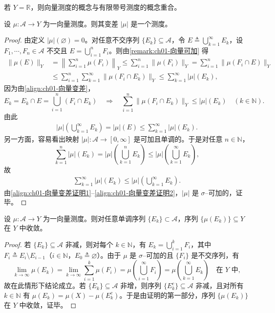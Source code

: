 \documentclass[../../main.tex]{subfiles}%
\begin{document}
\begin{remark}\label{remark:ch01-向量测度Y=R}
若 $Y=\mathbb{R}$，则向量测度的概念与有限带号测度的概念重合。
\end{remark}

\begin{proposition}\label{proposition:ch01-向量变差是测度}
设 $\mu:\mathcal{A}\to Y$ 为一向量测度。则其变差 $|\mu|$ 是一个测度。
\end{proposition}

\begin{proof}
由定义 $|\mu|(\varnothing )=0$。对任意不交序列 $\{E_k\}\subseteq\mathcal{A}$，令 $E\triangleq \bigcup_{k=1}^\infty E_k$，设 $F_1,\cdots ,F_n\in\mathcal{A}$ 不交且 $E=\bigcup_{i=1}^n F_i$。则由\cref{remark:ch01-向量可加} 得
\[
\begin{aligned}
\|\mu(E)\|_Y
&=\left\|\sum_{i=1}^n\mu(F_i)\right\|_Y
\leqslant\sum_{i=1}^n\|\mu(F_i)\|_Y
=\sum_{i=1}^n\|\mu(F_i\cap E)\|_Y\\
&\leqslant\sum_{i=1}^n\sum_{k=1}^\infty\|\mu(F_i\cap E_k)\|_Y
\leqslant\sum_{k=1}^\infty|\mu|(E_k),
\end{aligned}
\]
因为由\eqref{align:ch01-向量变差}，
\[
E_k=E_k\cap E=\bigcup_{i=1}^n(F_i\cap E_k)
\quad\Rightarrow\quad
\sum_{i=1}^n\|\mu(F_i\cap E_k)\|_Y\leqslant|\mu|(E_k)\quad(k\in\mathbb{N}).
\]
由此
\begin{align}
|\mu|\left(\bigcup_{k=1}^\infty E_k\right)=|\mu|(E)\leqslant\sum_{k=1}^\infty|\mu|(E_k). \label{align:ch01-向量变差证明1}
\end{align}
另一方面，容易看出映射 $|\mu|:\mathcal{A}\to[0,\infty]$ 是可加且单调的。于是对任意 $n\in\mathbb{N}$，
\[
\sum_{k=1}^n|\mu|(E_k)=|\mu|\left(\bigcup_{k=1}^n E_k\right)\leqslant|\mu|\left(\bigcup_{k=1}^\infty E_k\right),
\]
故
\begin{align}
\sum_{k=1}^\infty|\mu|(E_k)\leqslant|\mu|\left(\bigcup_{k=1}^\infty E_k\right). \label{align:ch01-向量变差证明2}
\end{align}
由\eqref{align:ch01-向量变差证明1}--\eqref{align:ch01-向量变差证明2}，$|\mu|$ 是 $\sigma$--可加的，证毕。
\end{proof}

\begin{lemma}\label{lemma:ch01-向量单调序列收敛}
\label{lemma:ch01-向量测度连续}
设 $\mu:\mathcal{A}\to Y$ 为一向量测度。则对任意单调序列 $\{E_k\}\subset\mathcal{A}$，序列 $\{\mu(E_k)\}\subseteq Y$ 在 $Y$ 中收敛。
\end{lemma}

\begin{proof}
若 $\{E_k\}\subseteq\mathcal{A}$ 非减，则对每个 $k\in\mathbb{N}$，有 $E_k=\bigcup_{i=1}^k F_i$，其中 $F_i\triangleq E_i\setminus E_{i-1}$（$i\in\mathbb{N}$，$E_0\triangleq \varnothing $）。由于 $\mu$ 是 $\sigma$--可加的且 $\{F_i\}$ 是不交序列，有
\[
\lim_{k\to\infty}\mu(E_k)=\lim_{k\to\infty}\sum_{i=1}^k\mu(F_i)
=\mu\left(\bigcup_{i=1}^\infty F_i\right)=\mu\left(\bigcup_{k=1}^\infty E_k\right)\quad\text{在 }Y\text{ 中},
\]
故在此情形下结论成立。若 $\{E_k\}\subseteq\mathcal{A}$ 非增，则序列 $\{E_k^c\}\subseteq\mathcal{A}$ 非减，且对所有 $k\in\mathbb{N}$ 有 $\mu(E_k)=\mu(X)-\mu(E_k^c)$。于是由证明的第一部分，序列 $\{\mu(E_k)\}$ 在 $Y$ 中收敛，证毕。
\end{proof}
\end{document}
